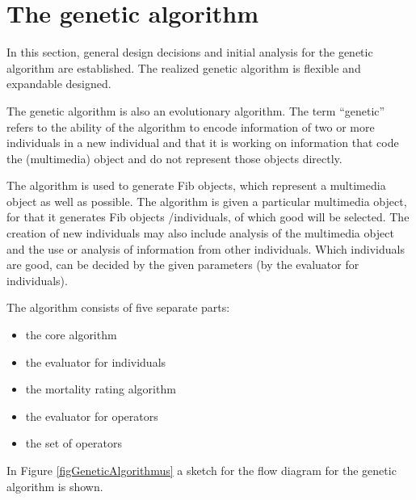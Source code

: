%
%
%
%

\graphicspath{{./stock_environment/}}
\graphicspath{{./stock_environment/}{../stock_environment}}


\newpage
\part{The genetic algorithm}
\label{secGeneticAlgorithmDesign}

In this section, general design decisions and initial analysis for the genetic algorithm are established.
The realized genetic algorithm is flexible and expandable designed.

The genetic algorithm is also an evolutionary algorithm. The term ``genetic'' refers to the ability of the algorithm to encode information of two or more individuals in a new individual and that it is working on information that code the (multimedia) object and do not represent those objects directly.

The algorithm is used to generate Fib objects, which represent a multimedia object as well as possible. The algorithm is given a particular multimedia object, for that it generates Fib objects /individuals, of which good will be selected. The creation of new individuals may also include analysis of the multimedia object and the use or analysis of information from other individuals. Which individuals are good, can be decided by the given parameters (by the evaluator for individuals).

\bigskip\noindent
The algorithm consists of five separate parts:
\begin{itemize}
 \item the core algorithm
 \item the evaluator for individuals
 \item the mortality rating algorithm
 \item the evaluator for operators
 \item the set of operators
\end{itemize}

In Figure \ref{figGeneticAlgorithmus} a sketch for the flow diagram for the genetic algorithm is shown.

